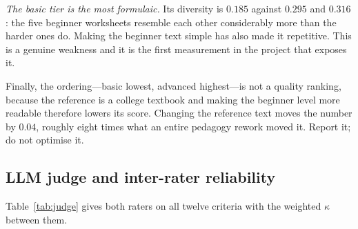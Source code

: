 \documentclass[conference]{IEEEtran}
\begin{document}
\emph{The basic tier is the most formulaic.} Its diversity is $0.185$ against
$0.295$ and $0.316$: the five beginner worksheets resemble each other
considerably more than the harder ones do. Making the beginner text simple has
also made it repetitive. This is a genuine weakness and it is the first
measurement in the project that exposes it.

Finally, the ordering---basic lowest, advanced highest---is not a quality
ranking, because the reference is a college textbook and making the beginner
level more readable therefore lowers its score. Changing the reference text
moves the number by $0.04$, roughly eight times what an entire pedagogy rework
moved it. Report it; do not optimise it.

\subsection{LLM judge and inter-rater reliability}

Table~\ref{tab:judge} gives both raters on all twelve criteria with the
weighted $\kappa$ between them.
\end{document}
